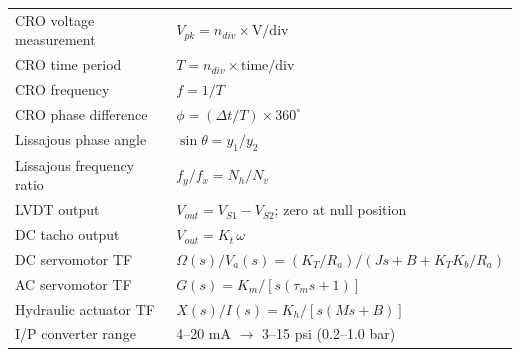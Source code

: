 \documentclass[12pt,a4paper]{article}
\begin{document}
\begin{tcolorbox}[formulabox, title={\textbf{Key Formulas at a Glance}}]
\begin{tabularx}{\linewidth}{B{5.0cm} X}
CRO voltage measurement     & $V_{pk} = n_{div} \times \text{V/div}$ \\[2pt]
CRO time period             & $T = n_{div} \times \text{time/div}$ \\[2pt]
CRO frequency               & $f = 1/T$ \\[2pt]
CRO phase difference        & $\phi = (\Delta t / T)\times 360^\circ$ \\[2pt]
Lissajous phase angle       & $\sin\theta = y_1/y_2$ \\[2pt]
Lissajous frequency ratio   & $f_y/f_x = N_h/N_v$ \\[2pt]
LVDT output                 & $V_{out} = V_{S1} - V_{S2}$; zero at null position \\[2pt]
DC tacho output             & $V_{out} = K_t\,\omega$ \\[2pt]
DC servomotor TF            & $\Omega(s)/V_a(s) = (K_T/R_a)/(Js+B+K_TK_b/R_a)$ \\[2pt]
AC servomotor TF            & $G(s) = K_m/[s(\tau_m s+1)]$ \\[2pt]
Hydraulic actuator TF       & $X(s)/I(s) = K_h/[s(Ms+B)]$ \\[2pt]
I/P converter range         & 4--20 mA $\to$ 3--15 psi (0.2--1.0 bar)
\end{tabularx}
\end{tcolorbox}

\vspace{5pt}
\end{document}
